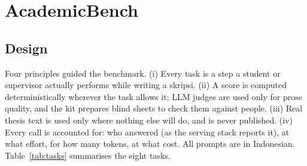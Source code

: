 \section{AcademicBench}
\label{sec:bench}

\subsection{Design}
Four principles guided the benchmark. (i) Every task is a step a student or supervisor actually performs while writing a skripsi. (ii) A score is computed deterministically wherever the task allows it; LLM judges are used only for prose quality, and the kit prepares blind sheets to check them against people. (iii) Real thesis text is used only where nothing else will do, and is never published. (iv) Every call is accounted for: who answered (as the serving stack reports it), at what effort, for how many tokens, at what cost. All prompts are in Indonesian. Table~\ref{tab:tasks} summarises the eight tasks.

